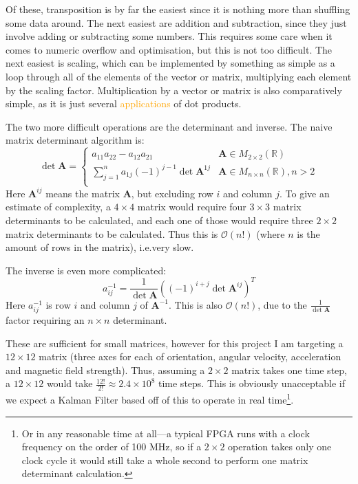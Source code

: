 \documentclass[12pt]{article}
\newcommand{\change}[2][]{\textcolor{orange}{#2}}
\begin{document}
Of these, transposition is by far the easiest since it is nothing more than shuffling some data around. The next easiest are addition and subtraction, since they just involve adding or subtracting some numbers. This requires some care when it comes to numeric overflow and optimisation, but this is not too difficult. The next easiest is scaling, which can be implemented by something as simple as a loop through all of the elements of the vector or matrix, multiplying each element by the scaling factor. Multiplication by a vector or matrix is also comparatively simple, as it is just several \change{applications} of dot products.

The two more difficult operations are the determinant and inverse. The naive matrix determinant algorithm \cite{strang2006linear} is:
\begin{equation}
	\det{\mathbf{A}} = 
	\begin{cases}
	a_{11}a_{22} - a_{12}a_{21}& \mathbf{A} \in M_{2 \times 2}(\mathbb{R})\\
	\sum_{j=1}^{n} a_{1j}  (-1)^{j-1}\det{\mathbf{A}^{1j}} & \mathbf{A} \in M_{n \times n}(\mathbb{R}), n > 2\\
	\end{cases}
\end{equation}
Here $\mathbf{A}^{ij}$ means the matrix $\mathbf{A}$, but excluding row $i$ and column $j$. To give an estimate of complexity, a $4\times4$ matrix would require four $3\times3$ matrix determinants to be calculated, and each one of those would require three $2\times2$ matrix determinants to be calculated. Thus this is $\mathcal{O}(n!)$ (where $n$ is the amount of rows in the matrix), i.e.\@ very slow.

The inverse is even more complicated:
\begin{equation}
	a^{-1}_{ij} = \frac{1}{\det{\mathbf{A}}} \left((-1)^{i+j} \det{\mathbf{A}^{ij}}\right)^T
\end{equation}
Here $a^{-1}_{ij}$ is row $i$ and column $j$ of $\mathbf{A}^{-1}$. This is also $\mathcal{O}(n!)$, due to the $\frac{1}{\det{\mathbf{A}}}$ factor requiring an $n \times n$ determinant.

These are sufficient for small matrices, however for this project I am targeting a $12 \times 12$ matrix (three axes for each of orientation, angular velocity, acceleration and magnetic field strength). Thus, assuming a $2\times2$ matrix takes one time step, a $12 \times 12$ would take $\frac{12!}{2!} \approx 2.4 \times 10^8$ time steps. This is obviously unacceptable if we expect a Kalman Filter based off of this to operate in real time\footnote{Or in any reasonable time at all---a typical FPGA runs with a clock frequency on the order of 100 MHz, so if a $2\times2$ operation takes only one clock cycle it would still take a whole second to perform one matrix determinant calculation.}.
\end{document}
